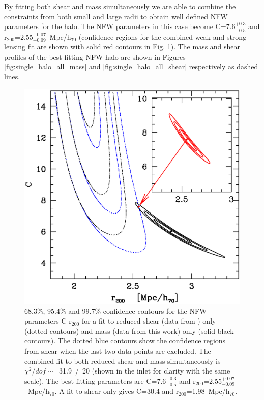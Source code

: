 \documentclass[useAMS,usenatbib]{mn2e}
\newcounter{two}   \setcounter{two}{2}
\begin{document}
By fitting both shear and mass simultaneously we are able to combine
the constraints from both small and large radii to obtain well defined
NFW parameters for the halo. The NFW parameters in this case become
C=7.6$^{+0.3}_{-0.5}$ and
r$_{200}$=2.55$^{+0.07}_{-0.09}$~Mpc/h$_{70}$ (confidence regions for
the combined weak and strong lensing fit are shown with solid red
contours in Fig. \ref{fig:single_halo_nfw_all}).  The mass and shear
profiles of the best fitting NFW halo are shown in Figures
\ref{fig:single_halo_all_mass} and \ref{fig:single_halo_all_shear}
respectively as dashed lines.

\begin{figure}
  \centering
  \includegraphics[width=\columnwidth]{figs/single_nfw_gbbs_both_lin_chi2.ps}
  \caption{68.3\%, 95.4\% and 99.7\% confidence contours for the NFW
  parameters C-r$_{200}$ for a fit to reduced shear (data from
  \citet{broadhurst:05b}) only (dotted contours) and mass (data from
  this work) only (solid black contours). The dotted blue contours
  show the confidence regions from shear when the last two data points
  are excluded. The combined fit to both reduced shear and mass
  simultaneously is $\chi^2/dof\sim$~31.9~/~20 (shown in the inlet for
  clarity with the same scale). The best fitting parameters are
  C=7.6$^{+0.3}_{-0.5}$ and
  r$_{200}$=2.55$^{+0.07}_{-0.09}$~Mpc/h$_{70}$. A fit to shear only
  gives C=30.4 and r$_{200}$=1.98~Mpc/h$_{70}$.}
  \label{fig:single_halo_nfw_all}
\end{figure}
\end{document}
